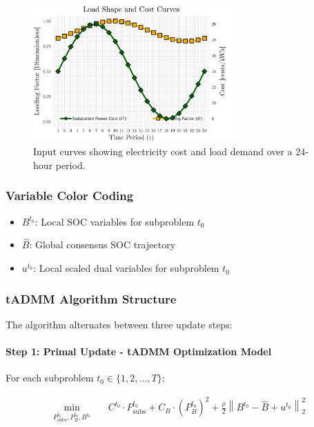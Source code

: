 \begin{figure}[h]
    \centering
    \includegraphics[width=0.7\textwidth]{figures/input-curves-cost-and-load-only-T24.png}
    \caption{Input curves showing electricity cost and load demand over a 24-hour period.}
    \label{fig:input_curves}
\end{figure}

\subsubsection{Variable Color Coding}
\begin{itemize}
    \item $B^{t_0}$: Local SOC variables for subproblem $t_0$
    \item $\hat{B}$: Global consensus SOC trajectory
    \item $u^{t_0}$: Local scaled dual variables for subproblem $t_0$
\end{itemize}

\subsubsection{tADMM Algorithm Structure}

The algorithm alternates between three update steps:

\paragraph{Step 1: Primal Update - tADMM Optimization Model}
For each subproblem $t_0 \in \{1, 2, \ldots, T\}$:

\begin{align}
\min_{P_{\text{subs}}^{t_0}, P_{B}^{t_0}, B^{t_0}} \quad & C^{t_0} \cdot P_{\text{subs}}^{t_0} + C_B \cdot \left(P_{B}^{t_0}\right)^2 + \frac{\rho}{2} \left\| B^{t_0} - \hat{B} + u^{t_0} \right\|_2^2
\end{align}

